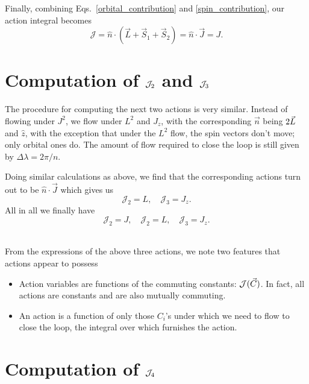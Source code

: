 Finally, combining Eqs.~\eqref{orbital_contribution} and \eqref{spin_contribution},
our action integral becomes 
\begin{equation}
\mathcal{J}=\hat{n} \cdot\left(\vec{L}+\vec{S}_{1}+\vec{S}_{2}\right)=\hat{n} \cdot \vec{J} = J.
\end{equation}




\section{Computation of $\mathcal{J}_2$ and $\mathcal{J}_3$}

The procedure for computing the next two actions is very similar.
Instead of flowing under $J^2$, we flow under $L^2$ and $J_z$,
with the corresponding $\vec{n}$ being $2 \vec{L}$ and $\hat{z}$,
with the exception that under the $L^2$ flow, the spin vectors
don't move; only orbital ones do.
The amount of flow required to close the loop is still given by
$\Delta \lambda = 2 \pi/n$.


Doing similar calculations as above, we find that the 
corresponding actions turn out to be $\hat{n} \cdot \vec{J}$
which gives us 
\begin{equation}
\mathcal{J}_{2}= L , \quad \mathcal{J}_{3}=  J_z.
\end{equation}
All in all we finally have 
\begin{equation}
\mathcal{J}_{2}= J, \quad\mathcal{J}_{2}= L , \quad \mathcal{J}_{3}=  J_z.
\end{equation} \\



\begin{tcolorbox}
From the expressions of the above three actions, we note two features
that actions appear to possess
\begin{itemize}
\item Action variables are functions of the commuting constants: $\mathcal{J}(\vec{C})$.
In fact, all actions are constants and are also mutually commuting. 
\item An action is a function of only those $C_i$'s under which we need to flow
to close the loop, the integral over which furnishes the action. 
\end{itemize}
\end{tcolorbox}





\section{Computation of $\mathcal{J}_4$}


